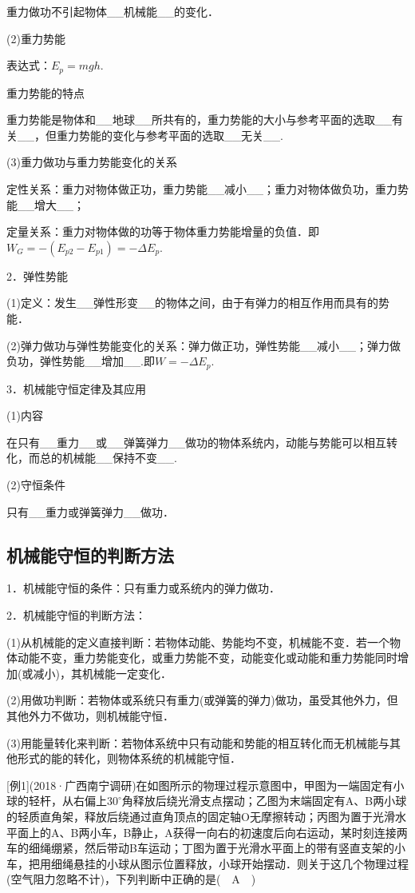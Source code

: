 重力做功不引起物体\_\_机械能\_\_的变化．

(2)重力势能

表达式：$E_p=mgh$.

重力势能的特点

重力势能是物体和\_\_地球\_\_所共有的，重力势能的大小与参考平面的选取\_\_有关\_\_，但重力势能的变化与参考平面的选取\_\_无关\_\_.

(3)重力做功与重力势能变化的关系

定性关系：重力对物体做正功，重力势能\_\_减小\_\_；重力对物体做负功，重力势能\_\_增大\_\_；

定量关系：重力对物体做的功等于物体重力势能增量的负值．即$W_G=-(E_{p2}-E_{p1})=-\Delta E_p$.

2．弹性势能

(1)定义：发生\_\_弹性形变\_\_的物体之间，由于有弹力的相互作用而具有的势能．

(2)弹力做功与弹性势能变化的关系：弹力做正功，弹性势能\_\_减小\_\_；弹力做负功，弹性势能\_\_增加\_\_.即$W=-\Delta E_p$.

3．机械能守恒定律及其应用

(1)内容

在只有\_\_重力\_\_或\_\_弹簧弹力\_\_做功的物体系统内，动能与势能可以相互转化，而总的机械能\_\_保持不变\_\_.

(2)守恒条件

只有\_\_重力或弹簧弹力\_\_做功．


\newpage
\subsection{机械能守恒的判断方法}

1．机械能守恒的条件：只有重力或系统内的弹力做功．

2．机械能守恒的判断方法：

(1)从机械能的定义直接判断：若物体动能、势能均不变，机械能不变．若一个物体动能不变，重力势能变化，或重力势能不变，动能变化或动能和重力势能同时增加(或减小)，其机械能一定变化．

(2)用做功判断：若物体或系统只有重力(或弹簧的弹力)做功，虽受其他外力，但其他外力不做功，则机械能守恒．

(3)用能量转化来判断：若物体系统中只有动能和势能的相互转化而无机械能与其他形式的能的转化，则物体系统的机械能守恒．

{[}例1{]}(2018·广西南宁调研)在如图所示的物理过程示意图中，甲图为一端固定有小球的轻杆，从右偏上$30^\circ$角释放后绕光滑支点摆动；乙图为末端固定有A、B两小球的轻质直角架，释放后绕通过直角顶点的固定轴O无摩擦转动；丙图为置于光滑水平面上的A、B两小车，B静止，A获得一向右的初速度后向右运动，某时刻连接两车的细绳绷紧，然后带动B车运动；丁图为置于光滑水平面上的带有竖直支架的小车，把用细绳悬挂的小球从图示位置释放，小球开始摆动．则关于这几个物理过程(空气阻力忽略不计)，下列判断中正确的是(　A　)


